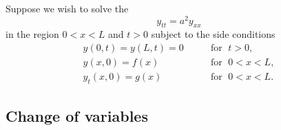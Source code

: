 Suppose we wish to solve the 
\begin{equation} \label{dalemb:weq}
y_{tt} = a^2 y_{xx}
\end{equation}
in the region $0 < x < L$ and $t > 0$
subject to the side conditions
\begin{equation} \label{dalemb:weqside}
\begin{array}{ll}
y(0,t) =  y(L,t) = 0 &
\qquad \text{for } \; t > 0 , \\
y(x,0) = f(x) & \qquad \text{for } \; 0 < x < L , \\
y_t(x,0) = g(x) &  \qquad \text{for } \; 0 < x < L .
\end{array}
\end{equation}

\subsection{Change of variables}


